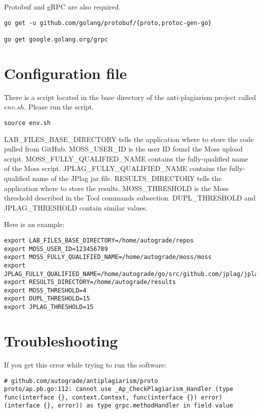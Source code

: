 \documentclass[12pt]{article}
\begin{document}
			Protobuf and gRPC are also required.

			\begin{lstlisting}[breaklines=true]	
go get -u github.com/golang/protobuf/{proto,protoc-gen-go}
			
go get google.golang.org/grpc
			\end{lstlisting}
			 
			
	\section{Configuration file}
		There is a script located in the base directory of the anti-plagiarism project called $env.sh$. Please run the script.
		\begin{lstlisting}[breaklines=true]	
source env.sh
		\end{lstlisting}
		
		LAB\_FILES\_BASE\_DIRECTORY tells the application where to store the code pulled from GitHub. MOSS\_USER\_ID is the user ID found the Moss upload script. MOSS\_FULLY\_QUALIFIED\_NAME contains the fully-qualified name of the Moss script. JPLAG\_FULLY\_QUALIFIED\_NAME contains the fully-qualified name of the JPlag jar file. RESULTS\_DIRECTORY tells the application where to store the results. MOSS\_THRESHOLD is the Moss threshold described in the Tool commands subsection. DUPL\_THRESHOLD and JPLAG\_THRESHOLD contain similar values.
			
		Here is an example:
		\begin{lstlisting}[breaklines=true]	
export LAB_FILES_BASE_DIRECTORY=/home/autograde/repos
export MOSS_USER_ID=123456789
export MOSS_FULLY_QUALIFIED_NAME=/home/autograde/moss/moss
export JPLAG_FULLY_QUALIFIED_NAME=/home/autograde/go/src/github.com/jplag/jplag/jplag/target/jplag.jar
export RESULTS_DIRECTORY=/home/autograde/results
export MOSS_THRESHOLD=4
export DUPL_THRESHOLD=15
export JPLAG_THRESHOLD=15
		\end{lstlisting}		

	\section{Troubleshooting}
		If you get this error while trying to run the software:
		
		\begin{lstlisting}[breaklines=true]	
# github.com/autograde/antiplagiarism/proto
proto/ap.pb.go:112: cannot use _Ap_CheckPlagiarism_Handler (type func(interface {}, context.Context, func(interface {}) error) (interface {}, error)) as type grpc.methodHandler in field value
		\end{lstlisting}
		
\end{document}
